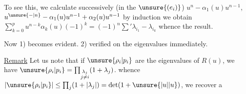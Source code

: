 To see this, we calculate successively (in the  $\unsure{(e_i)}$) $u^n-\alpha_1(u)u^{n-1}$, $u^{\unsure{-|n}}-\alpha_1(u)u^{n-1}+\alpha_2(u)u^{n-1}$ by induction we obtain $\sum_{k=0}^{p}u^{n-k}\alpha_k(u)(-1)^k=(-1)^n\sum'\lambda_{i_1}-\lambda_{i_k}$ whence  the result.

Now 1) becomes evident. 2)  verified on the eigenvalues immediately.

\uline{Remark} Let us note that if $\unsure{\rho_i|p_i}$ are the eigenvalues of $R(u)$, we have $\unsure{\rho_i|p_i}=\prod_{\substack{\lambda_j\\j\neq i}}(1+\lambda_j)$. whence $|\unsure{\rho_i|p_i}|\leq\prod_j(1+|\lambda_j|)=\det(1+\unsure{\lvert u\rvert|u})$, we recover a
